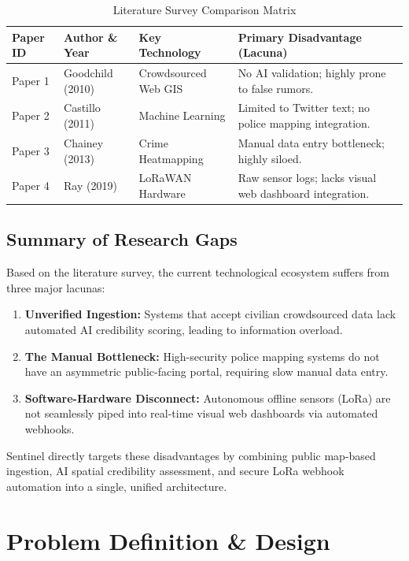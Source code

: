 \documentclass[12pt,a4paper]{report}
\begin{document}
\begin{table}[H]
\centering
\begin{tabular}{|p{2cm}|p{3.5cm}|p{3.5cm}|p{5cm}|}
\hline
\textbf{Paper ID} & \textbf{Author \& Year} & \textbf{Key Technology} & \textbf{Primary Disadvantage (Lacuna)} \\ \hline
Paper 1 & Goodchild (2010) & Crowdsourced Web GIS & No AI validation; highly prone to false rumors. \\ \hline
Paper 2 & Castillo (2011) & Machine Learning & Limited to Twitter text; no police mapping integration. \\ \hline
Paper 3 & Chainey (2013) & Crime Heatmapping & Manual data entry bottleneck; highly siloed. \\ \hline
Paper 4 & Ray (2019) & LoRaWAN Hardware & Raw sensor logs; lacks visual web dashboard integration. \\ \hline
\end{tabular}
\caption{Literature Survey Comparison Matrix}
\end{table}

\section{Summary of Research Gaps}
Based on the literature survey, the current technological ecosystem suffers from three major lacunas:
\begin{enumerate}
    \item \textbf{Unverified Ingestion:} Systems that accept civilian crowdsourced data lack automated AI credibility scoring, leading to information overload.
    \item \textbf{The Manual Bottleneck:} High-security police mapping systems do not have an asymmetric public-facing portal, requiring slow manual data entry.
    \item \textbf{Software-Hardware Disconnect:} Autonomous offline sensors (LoRa) are not seamlessly piped into real-time visual web dashboards via automated webhooks.
\end{enumerate}
Sentinel directly targets these disadvantages by combining public map-based ingestion, AI spatial credibility assessment, and secure LoRa webhook automation into a single, unified architecture.


\chapter{Problem Definition \& Design}
\end{document}

